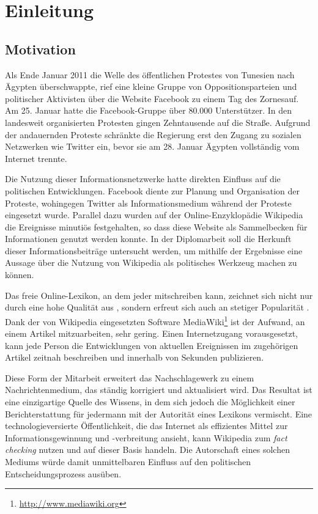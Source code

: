 \chapter{Einleitung}\label{ch:introduction}

\section{Motivation}

Als Ende Januar 2011 die Welle des öffentlichen Protestes von Tunesien nach Ägypten überschwappte, rief eine kleine Gruppe von Oppositionsparteien und politischer Aktivisten über die Website Facebook zu einem \glqq Tag des Zornes\grqq auf.
Am 25. Januar hatte die Facebook-Gruppe über 80.000 Unterstützer. 
In den landesweit organisierten Protesten gingen Zehntausende auf die Straße.
Aufgrund der andauernden Proteste schränkte die Regierung erst den Zugang zu sozialen Netzwerken wie Twitter ein, bevor sie am 28. Januar Ägypten vollständig vom Internet trennte.\cite{econ18013760, szegypt}
 
Die Nutzung dieser Informationsnetzwerke hatte direkten Einfluss auf die politischen Entwicklungen. 
Facebook diente zur Planung und Organisation der Proteste, wohingegen Twitter als Informationsmedium während der Proteste eingesetzt wurde. 
Parallel dazu wurden auf der Online-Enzyklopädie Wikipedia die Ereignisse minutiös festgehalten\cite{wikiegypt}, so dass diese Website als Sammelbecken für Informationen genutzt werden konnte. 
In der Diplomarbeit soll die Herkunft dieser Informationsbeiträge untersucht werden, um mithilfe der Ergebnisse eine Aussage über die Nutzung von Wikipedia als politisches Werkzeug machen zu können. 

Das freie Online-Lexikon, an dem jeder mitschreiben kann, zeichnet sich nicht nur durch eine hohe Qualität aus \cite{giles2005internet}, sondern erfreut sich auch an stetiger Popularität \cite{wikipv}. 
Dank der von Wikipedia eingesetzten Software MediaWiki\footnote{\url{http://www.mediawiki.org}} ist der Aufwand, an einem Artikel mitzuarbeiten, sehr gering.
Einen Internetzugang vorausgesetzt, kann jede Person die Entwicklungen von aktuellen Ereignissen im zugehörigen Artikel zeitnah beschreiben und innerhalb von Sekunden publizieren.

Diese Form der Mitarbeit erweitert das Nachschlagewerk zu einem Nachrichtenmedium, das ständig korrigiert und aktualisiert wird. 
Das Resultat ist eine einzigartige Quelle des Wissens, in dem sich jedoch die Möglichkeit einer Berichterstattung für jedermann mit der Autorität eines Lexikons vermischt. 
Eine technologieversierte Öffentlichkeit, die das Internet als effizientes Mittel zur Informationsgewinnung und -verbreitung ansieht, kann Wikipedia zum \emph{fact checking} nutzen und auf dieser Basis handeln.\cite[S. 424-427]{chadwick2009routledge}
Die Autorschaft eines solchen Mediums würde damit unmittelbaren Einfluss auf den politischen Entscheidungsprozess ausüben.

